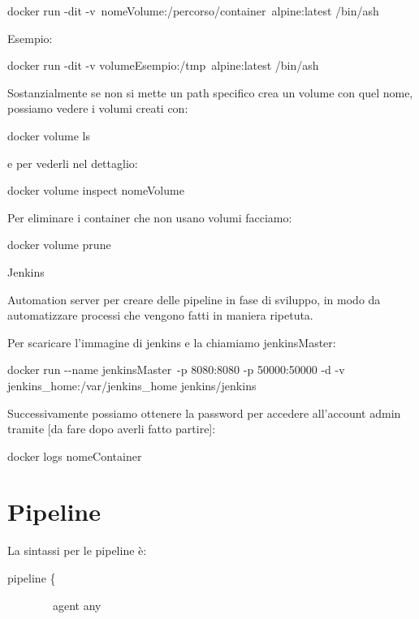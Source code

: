 \documentclass[
]{article}
\begin{document}
{}

{docker run -dit -v}{~}{nomeVolume:/percorso/container}{~alpine:latest
/bin/ash}

{}

{Esempio:}

{docker run -dit -v }{volumeEsempio:/tmp}{~alpine:latest /bin/ash}

{}

{Sostanzialmente se non si mette un path specifico crea un volume con
quel nome, possiamo }{vedere }{i volumi creati con:}

{}

{docker volume ls}

{e per vederli nel }{dettaglio}{:}

{}

{docker volume inspect nomeVolume}

{}

{Per }{eliminare }{i container che non usano volumi facciamo:}

{}

{docker volume prune}

{}

{}

{Jenkins}

{Automation server per creare delle pipeline in fase di sviluppo, in
modo da automatizzare processi che vengono fatti in maniera ripetuta.}

{}

{Per scaricare l'immagine di jenkins e la }{chiamiamo
}{jenkinsMaster}{:}

{}

{docker run }{-\/-name }{jenkinsMaster}{~-p 8080:8080 -p 50000:50000 -d
-v jenkins\_home:/var/jenkins\_home jenkins/jenkins}

{}

{Successivamente possiamo ottenere la password per accedere all'account
admin tramite {[}da fare dopo averli fatto partire{]}:}

{}

{docker logs nomeContainer}

\section{\texorpdfstring{{Pipeline}}{Pipeline}}\label{h.wjsoppaj92od}

{La sintassi per le pipeline è:}

{pipeline \{}

{~~~~~~~~agent any }
\end{document}
